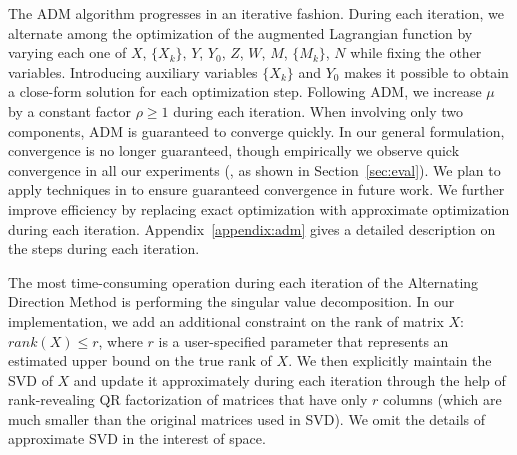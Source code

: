 
The ADM algorithm progresses in an iterative fashion.  During each
iteration, we alternate among the optimization of the augmented
Lagrangian function by varying each one of $X$, $\{X_k\}$, $Y$, $Y_0$,
$Z$, $W$, $M$, $\{M_k\}$, $N$ while fixing the other variables.  
Introducing auxiliary variables $\{X_k\}$ and $Y_0$ makes it
possible to obtain a close-form solution for each optimization
step. Following ADM, 
we increase $\mu$ by a constant factor $\rho \geq 1$ during each
iteration.  When involving only two components, ADM is guaranteed to
converge quickly.  In our general formulation, convergence is no
longer guaranteed, though empirically we observe quick convergence in
all our experiments (\eg, as shown in Section~\ref{sec:eval}).  We
plan to apply techniques in \cite{convergence} to ensure guaranteed
convergence in future work. We further improve efficiency by
replacing exact optimization with approximate optimization during each
iteration. Appendix~\ref{appendix:adm} gives a detailed description on
the steps during each iteration.

 The most
time-consuming operation during each iteration of the Alternating
Direction Method is performing the singular value decomposition.  In
our implementation, we add an additional constraint on the rank of
matrix $X$: $ rank(X) \leq r$, where $r$ is a user-specified parameter
that represents an estimated upper bound on the true rank of $X$.  We
then explicitly maintain the SVD of $X$ and update it approximately
during each iteration through the help of rank-revealing QR
factorization of matrices that have only $r$ columns (which are much
smaller than the original matrices used in SVD).  We omit the details
of approximate SVD in the interest of space.  %
  
